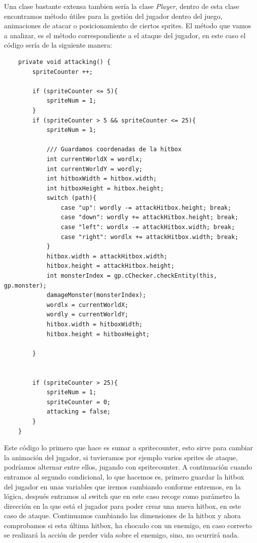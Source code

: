 \documentclass[a4paper]{article}
\begin{document}
Una clase bastante extensa tambien sería la clase \textit{Player}, dentro de esta clase encontramos método útiles para la gestión del jugador dentro del juego, animaciones de atacar o posicionamiento de ciertos sprites. El método que vamos a analizar, es el método correspondiente a 
el ataque del jugador, en este caso el código sería de la siguiente manera:
\begin{lstlisting}
    private void attacking() {
        spriteCounter ++;

        if (spriteCounter <= 5){
            spriteNum = 1;
        }
        if (spriteCounter > 5 && spriteCounter <= 25){
            spriteNum = 1;

            /// Guardamos coordenadas de la hitbox
            int currentWorldX = wordlx;
            int currentWorldY = wordly;
            int hitboxWidth = hitbox.width;
            int hitboxHeight = hitbox.height;
            switch (path){
                case "up": wordly -= attackHitbox.height; break;
                case "down": wordly += attackHitbox.height; break;
                case "left": wordlx -= attackHitbox.width; break;
                case "right": wordlx += attackHitbox.width; break;
            }
            hitbox.width = attackHitbox.width;
            hitbox.height = attackHitbox.height;
            int monsterIndex = gp.cChecker.checkEntity(this, gp.monster);
            damageMonster(monsterIndex);
            wordlx = currentWorldX;
            wordly = currentWorldY;
            hitbox.width = hitboxWidth;
            hitbox.height = hitboxHeight;

        }


        if (spriteCounter > 25){
            spriteNum = 1;
            spriteCounter = 0;
            attacking = false;
        }
    }
\end{lstlisting}
Este código lo primero que hace es sumar a spritecounter, esto sirve para cambiar la animación del jugador, si tuvieramos por ejemplo varios sprites de ataque, podríamos alternar entre ellos,
jugando con spritecounter. A continuación cuando entramos al segundo condicional, lo que hacemos es, primero guardar la hitbox del jugador en unas variables que iremos cambiando conforme entremos,
en la lógica, después entramos al switch que en este caso recoge como parámetro la dirección en la que está el jugador para poder crear una nueva hitbox, en este caso de ataque.
Continuamos cambiando las dimensiones de la hitbox y ahora comprobamos si esta última hitbox, ha chocado con un enemigo, en caso correcto se realizará la acción de perder vida sobre el enemigo, sino, no ocurrirá nada.
\end{document}
